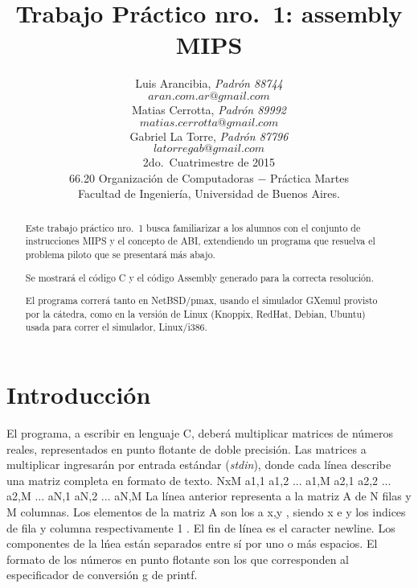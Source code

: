 \documentclass[a4paper,10pt]{article}
\begin{document}
\title{Trabajo Pr\'actico nro.~1: assembly MIPS} 

\author{	
Luis Arancibia, \textit{Padr\'on 88744} 	\\	\texttt{$aran.com.ar@gmail.com$}	\\[2.5ex] 	
Matias Cerrotta, \textit{Padr\'on 89992} 	\\	\texttt{$matias.cerrotta@gmail.com$} 		\\[2.5ex]
Gabriel La Torre, \textit{Padr\'on 87796}	\\	\texttt{$latorregab@gmail.com$}			\\[2.5ex]
\normalsize{2do.~Cuatrimestre de 2015}		\\
\normalsize{66.20 Organizaci\'on de Computadoras  $-$ Pr\'actica Martes}	\\
\normalsize{Facultad de Ingenier\'ia, Universidad de Buenos Aires.}			\\
}

\date{}
\maketitle
\thispagestyle{empty}   %
\pagebreak

\begin{abstract}
Este trabajo pr\'actico nro.~1 busca familiarizar a los alumnos con el conjunto de instrucciones MIPS y el concepto de ABI, extendiendo un programa que resuelva el problema piloto que se presentar\'a m\'as abajo. 

Se mostrar\'a el c\'odigo C y el c\'odigo Assembly generado para la correcta resoluci\'on.

El programa correr\'a tanto en NetBSD/pmax, usando el simulador GXemul provisto por la c\'atedra, como en la versi\'on de Linux (Knoppix, RedHat, Debian, Ubuntu) usada para correr el simulador, Linux/i386.

\end{abstract} 
\pagebreak


\section{Introducci\'on}

El programa, a escribir en lenguaje C, deber\'a multiplicar matrices de n\'umeros reales, representados en punto flotante de doble precisi\'on. Las matrices a multiplicar ingresar\'an por entrada est\'andar (\textit{stdin}), donde cada l\'inea describe una matriz completa en formato de texto.
\newline \newline
NxM a1,1 a1,2 ... a1,M a2,1 a2,2 ... a2,M ... aN,1 aN,2 ... aN,M
\newline \newline
La l\'inea anterior representa a la matriz A de N filas y M columnas. Los elementos de la matriz A son los a x,y , siendo x e y los indices de fila y columna respectivamente 1 . El fin de l\'inea es el caracter newline. Los componentes de la l\'nea est\'an separados entre s\'i por uno o m\'as espacios. El formato de los n\'umeros en punto flotante son los que corresponden al especificador de conversi\'on g de printf.
\end{document}
